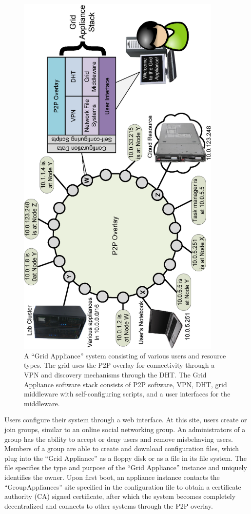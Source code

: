 \documentclass[conference]{IEEEtran}
\begin{document}
\begin{figure}[ht]
\centering
\includegraphics[width=4in,angle=-90]{figs/appliance_overlays.eps}
\caption{A ``Grid Appliance'' system consisting of various users and resource
types.  The grid uses the P2P overlay for connectivity through a VPN and
discovery mechanisms through the DHT.  The Grid Appliance software stack
consists of P2P software, VPN, DHT, grid middleware with self-configuring
scripts, and a user interfaces for the middleware.}
\label{fig:appliance}
\end{figure}

Users configure their system through a web interface.  At this site, users
create or join groups, similar to an online social networking group.  An
administrators of a group has the ability to accept or deny users and remove
misbehaving users.  Members of a group are able to create and download
configuration files, which plug into the ``Grid Appliance'' as a floppy disk or
as a file in its file system.  The file specifies the type and purpose of the
``Grid Appliance'' instance and uniquely identifies the owner.  Upon first
boot, an appliance instance contacts the ``GroupAppliances'' site specified in
the configuration file to obtain a certificate authority (CA) signed
certificate, after which the system becomes completely decentralized and
connects to other systems through the P2P overlay.  
\end{document}
